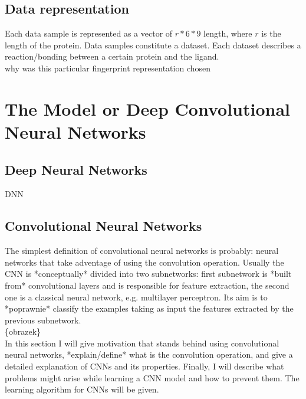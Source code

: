 \documentclass[a4paper,10pt]{report}
\begin{document}
    \section{Data representation} %
    Each data sample is represented as a vector of $r*6*9$ length, where $r$ is the length of the protein. Data samples constitute a dataset. Each dataset describes a reaction/bonding between a certain protein and the ligand.\\
    
    why was this particular fingerprint representation chosen %
    
    
  \chapter{The Model or Deep Convolutional Neural Networks}
    
    \section{Deep Neural Networks}
      DNN

    \section{Convolutional Neural Networks}
      The simplest definition of convolutional neural networks is probably: neural networks that take adventage of using the convolution operation. Usually the CNN is *conceptually* divided into two subnetworks: first subnetwork is *built from* convolutional layers and is responsible for feature extraction, the second one is a classical neural network, e.g. multilayer perceptron. Its aim is to *poprawnie* classify the examples taking as input the features extracted by the previous subnetwork.\\
      
      \{obrazek\} \\ %
      
      In this section I will give motivation that stands behind using convolutional neural networks, *explain/define* what is the convolution operation, and give a detailed explanation of CNNs and its properties. Finally, I will describe what problems might arise while learning a CNN model and how to prevent them. The learning algorithm for CNNs will be given.\\
      
\end{document}
